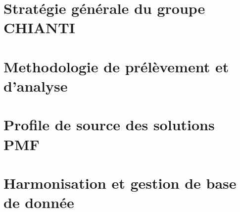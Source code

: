
\section{Stratégie générale du groupe CHIANTI}%
\label{sec:stratégie_générale_du_groupe_chianti}

\section{Methodologie de prélèvement et d'analyse}%
\label{sec:methodologie_de_prélèvement_et_d_analyse}

\section{Profile de source des solutions PMF}%
\label{sec:profile_de_source_des_solutions_pmf}

\section{Harmonisation et gestion de base de donnée}%
\label{sec:harmonisation_et_gestion_de_base_de_donnée}

